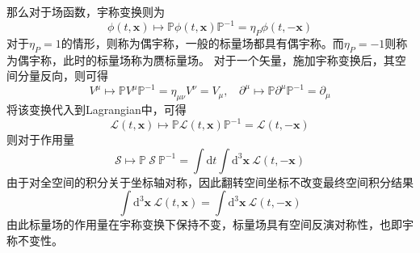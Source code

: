 那么对于场函数，宇称变换则为
\begin{equation}
    \phi(t,\boldsymbol{x}) \mapsto \mathbb{P}\phi(t,\boldsymbol{x})\mathbb{P}^{-1}  = \eta_P \phi(t,-\boldsymbol{x})
\end{equation}
对于$\eta_P=1$的情形，则称为偶宇称，一般的标量场都具有偶宇称。而$\eta_P=-1$则称为偶宇称，此时的标量场称为赝标量场。
对于一个矢量，施加宇称变换后，其空间分量反向，则可得
\begin{equation}
    V^\mu \mapsto \mathbb{P} V^\mu \mathbb{P}^{-1} = \eta_{\mu\nu}V^{\nu} = V_\mu,~~~~\partial^\mu \mapsto \mathbb{P} \partial^\mu \mathbb{P}^{-1}  = \partial_\mu
\end{equation}
将该变换代入到Lagrangian中，可得
\begin{equation}
    \mathscr{L}(t,\boldsymbol{x}) \mapsto \mathbb{P}\mathscr{L}(t,\boldsymbol{x}) \mathbb{P}^{-1} = \mathscr{L}(t,-\boldsymbol{x}) 
\end{equation}
则对于作用量
\begin{equation}
     \mathcal{S}
\mapsto\mathbb{P}~\mathcal{S}~\mathbb{P}^{-1} = \int\mathrm{d}t\int\mathrm{d^3}\boldsymbol{x}~\mathscr{L}(t,-\boldsymbol{x}) 
\end{equation}
由于对全空间的积分关于坐标轴对称，因此翻转空间坐标不改变最终空间积分结果
\begin{equation}
    \int\mathrm{d}^3\boldsymbol{x} ~\mathscr{L}(t,\boldsymbol{x}) =  \int\mathrm{d}^3\boldsymbol{x} ~\mathscr{L}(t,-\boldsymbol{x})
\end{equation}
由此标量场的作用量在宇称变换下保持不变，标量场具有空间反演对称性，也即宇称不变性。

